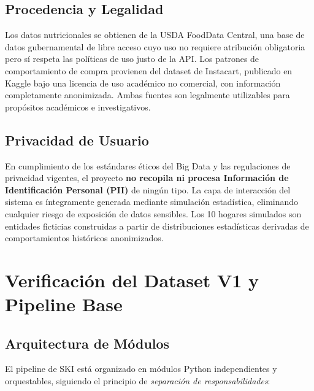 \documentclass[12pt,a4paper]{article}
\begin{document}
\subsection{Procedencia y Legalidad}

Los datos nutricionales se obtienen de la USDA FoodData Central, una base de datos gubernamental de libre acceso cuyo uso no requiere atribución obligatoria pero sí respeta las políticas de uso justo de la API. Los patrones de comportamiento de compra provienen del dataset de Instacart, publicado en Kaggle bajo una licencia de uso académico no comercial, con información completamente anonimizada. Ambas fuentes son legalmente utilizables para propósitos académicos e investigativos.

\subsection{Privacidad de Usuario}

En cumplimiento de los estándares éticos del Big Data y las regulaciones de privacidad vigentes, el proyecto \textbf{no recopila ni procesa Información de Identificación Personal (PII)} de ningún tipo. La capa de interacción del sistema es íntegramente generada mediante simulación estadística, eliminando cualquier riesgo de exposición de datos sensibles. Los 10 hogares simulados son entidades ficticias construidas a partir de distribuciones estadísticas derivadas de comportamientos históricos anonimizados.

\section{Verificación del Dataset V1 y Pipeline Base}

\subsection{Arquitectura de Módulos}

El pipeline de SKI está organizado en módulos Python independientes y orquestables, siguiendo el principio de \textit{separación de responsabilidades}:
\end{document}
